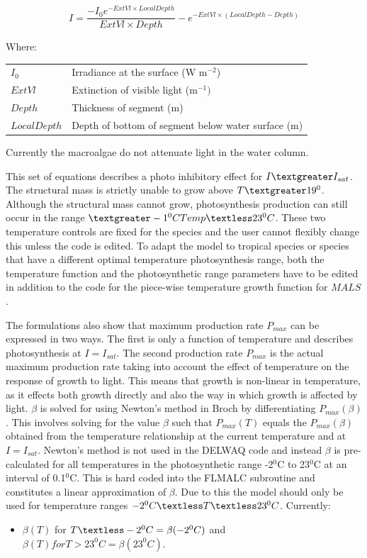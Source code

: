 \documentclass{deltares_manual}
\begin{document}
\begin{equation}
I = \frac{-I_{0}e^{-ExtVl \times LocalDepth}}{ExtVl \times Depth}  - e^{-ExtVl \times (LocalDepth - Depth)}
\end{equation}

Where:\\
\begin{tabular}{ll}
$I_{0}$ & Irradiance at the surface (W m$^{-2}$)\\
$ExtVl$ & Extinction of visible light (m$^{-1})$\\
$Depth$ & Thickness of segment (m)\\
$LocalDepth$ & Depth of bottom of segment below water surface (m)\\
\end{tabular}

Currently the macroalgae do not attenuate light in the water column.

This set of equations describes a photo inhibitory effect for $I\textgreater I_{sat}$. The structural mass is strictly unable to grow above $T \textgreater 19^{0}$. Although the structural mass cannot grow, photosynthesis production can still occur in the range $\textgreater -1^{0}C Temp \textless 23^{0}C$. These two temperature controls are fixed for the species and the user cannot flexibly change this unless the code is edited. To adapt the model to tropical species or species that have a different optimal temperature photosynthesis range, both the temperature function and the photosynthetic range parameters have to be edited in addition to the code for the piece-wise temperature growth function for $MALS$.

The formulations also show that maximum production rate $P_{max}$ can be expressed in two ways. The first is only a function of temperature and describes photosynthesis at $I = I_{sat}$. The second production rate $P_{max}$ is the actual maximum production rate taking into account the effect of temperature on the response of growth to light. This means that growth is non-linear in temperature, as it effects both growth directly and also the way in which growth is affected by light. $\beta$ is solved for using Newton's method in Broch by differentiating $P_{max}(\beta)$. This involves solving for the value $\beta$ such that $P_{max}(T)$ equals the $P_{max}(\beta)$ obtained from the temperature relationship at the current temperature and at $I = I_{sat}$. Newton's method is not used in the DELWAQ code and instead $\beta$ is pre-calculated for all temperatures in the photosynthetic range -2$^{0}$C to 23$^{0}$C at an interval of 0.1$^{0}$C. This is hard coded into the FLMALC subroutine and constitutes a linear approximation of $\beta$. Due to this the model should only be used for temperature ranges $-2^{0}C \textless T \textless 23^{0}C$. Currently:
\begin{itemize}
	\item $\beta(T)$ for $T \textless -2^{0}C = \beta(-2^{0}C)$ and $\beta(T) for T > 23^{0}C = \beta(23^{0}C)$. 
\end{itemize} 
\end{document}
